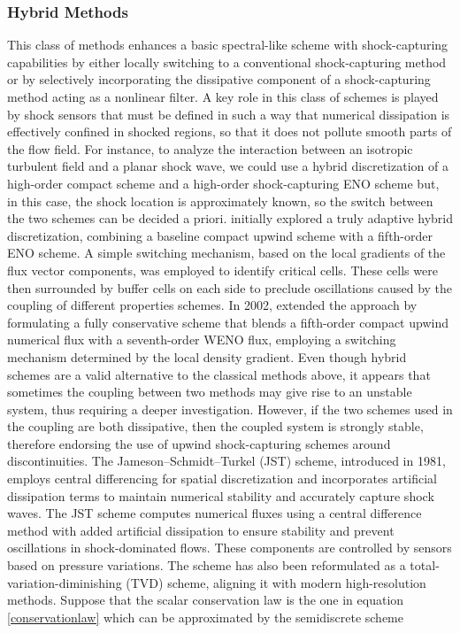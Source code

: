 \documentclass[a5paper]{sapthesis}
\begin{document}
	\subsubsection{Hybrid Methods}
	This class of methods enhances a basic spectral-like scheme with shock-capturing capabilities by either locally switching to a conventional shock-capturing method or by selectively incorporating the dissipative component of a shock-capturing method acting as a nonlinear filter. A key role in this class of schemes is played by shock sensors that must be deﬁned in such a way that numerical dissipation is effectively conﬁned in shocked regions, so that it does not pollute smooth parts of the ﬂow ﬁeld. For instance, to analyze the interaction between an isotropic turbulent field and a planar shock wave, we could use a hybrid discretization of a high-order compact scheme and a high-order shock-capturing ENO scheme but, in this case, the shock location is approximately known, so the switch between the two schemes can be decided a priori. \citet{ADAMS1996} initially explored a truly adaptive hybrid discretization, combining a baseline compact upwind scheme with a fifth-order ENO scheme. A simple switching mechanism, based on the local gradients of the flux vector components, was employed to identify critical cells. These cells were then surrounded by buffer cells on each side to preclude oscillations caused by the coupling of different properties schemes. In 2002, \citet{PIROZZOLI2002} extended the approach by formulating a fully conservative scheme that blends a fifth-order compact upwind numerical flux with a seventh-order WENO flux, employing a switching mechanism determined by the local density gradient. Even though hybrid schemes are a valid alternative to the classical methods above, it appears that sometimes the coupling between two methods may give rise to an unstable system, thus requiring a deeper investigation. However, if the two schemes used in the coupling are both dissipative, then the coupled system is strongly stable, therefore endorsing the use of upwind shock-capturing schemes around discontinuities. 
	The Jameson–Schmidt–Turkel (JST\cite{JST1981}) scheme, introduced in 1981, employs central differencing for spatial discretization and incorporates artificial dissipation terms to maintain numerical stability and accurately capture shock waves. The JST scheme computes numerical fluxes using a central difference method with added artificial dissipation to ensure stability and prevent oscillations in shock-dominated flows. These components are controlled by sensors based on pressure variations. The scheme has also been reformulated as a total-variation-diminishing (TVD) scheme, aligning it with modern high-resolution methods.    
	Suppose that the scalar conservation law is the one in equation \ref{conservationlaw} which can be approximated by the semidiscrete scheme
	
\end{document}
